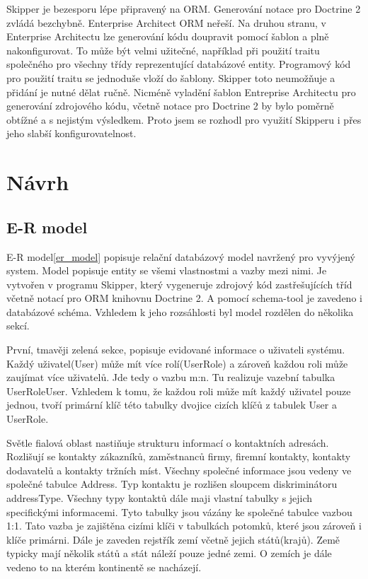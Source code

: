 \documentclass[thesis=B,czech]{FITthesis}[2012/06/26]
\begin{document}
	Skipper je bezesporu lépe připravený na ORM. Generování notace pro Doctrine 2 zvládá bezchybně. Enterprise Architect ORM neřeší. Na druhou stranu, v Enterprise Architectu lze generování kódu doupravit pomocí šablon a plně nakonfigurovat. To může být velmi užitečné, například při použití traitu společného pro všechny třídy reprezentující databázové entity. Programový kód pro použití traitu se jednoduše vloží do šablony. Skipper toto neumožňuje a přidání je nutné dělat ručně. Nicméně vyladění šablon Entreprise Architectu pro generování zdrojového kódu, včetně notace pro Doctrine 2 by bylo poměrně obtížné a s nejistým výsledkem. Proto jsem se rozhodl pro využití Skipperu i přes jeho slabší konfigurovatelnost.	


\chapter{Návrh}

\section{E-R model}
	E-R model\ref{er_model} popisuje relační databázový model navržený pro vyvýjený system. Model popisuje entity se všemi vlastnostmi a vazby mezi nimi. Je vytvořen v programu Skipper, který vygeneruje zdrojový kód zastřešujících tříd včetně notací pro ORM knihovnu Doctrine 2. A pomocí schema-tool je zavedeno i databázové schéma. Vzhledem k jeho rozsáhlosti byl model rozdělen do několika sekcí.
	
	První, tmavěji zelená sekce, popisuje evidované informace o uživateli systému. Každý uživatel(User) může mít více rolí(UserRole) a zároveň každou roli může zaujímat více uživatelů. Jde tedy o vazbu m:n. Tu realizuje vazební tabulka UserRoleUser. Vzhledem k tomu, že každou roli může mít každý uživatel pouze jednou, tvoří primární klíč této tabulky dvojice cizích klíčů z tabulek User a UserRole.
	
	Světle fialová oblast nastiňuje strukturu informací o kontaktních adresách. Rozlišují se kontakty zákazníků, zaměstnanců firmy, firemní kontakty, kontakty dodavatelů a kontakty tržních míst. Všechny společné informace jsou vedeny ve společné tabulce Address. Typ kontaktu je rozlišen sloupcem diskriminátoru addressType. Všechny typy kontaktů dále maji vlastní tabulky s jejich specifickými informacemi. Tyto tabulky jsou vázány ke společné tabulce vazbou 1:1. Tato vazba je zajištěna cizími klíči v tabulkách potomků, které jsou zároveň i klíče primárni. Dále je zaveden rejstřík zemí včetně jejich států(krajů). Země typicky mají několik států a stát náleží pouze jedné zemi. O zemích je dále vedeno to na kterém kontinentě se nacházejí.
	
\end{document}

